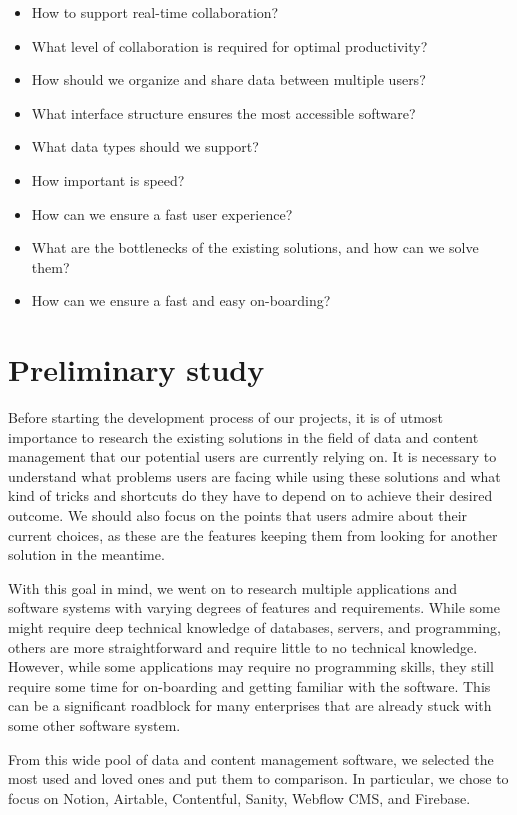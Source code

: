 \begin{itemize}
	\item How to support real-time collaboration?
	\item What level of collaboration is required for optimal productivity?
	\item How should we organize and share data between multiple users?
	\item What interface structure ensures the most accessible software?
	\item What data types should we support?
	\item How important is speed?
	\item How can we ensure a fast user experience?
	\item What are the bottlenecks of the existing solutions, and how can we solve them?
	\item How can we ensure a fast and easy on-boarding?
\end{itemize}

\section{Preliminary study}

Before starting the development process of our projects, it is of utmost importance to research the existing solutions in the field of data and content management that our potential users are currently relying on.
It is necessary to understand what problems users are facing while using these solutions and what kind of tricks and shortcuts do they have to depend on to achieve their desired outcome.
We should also focus on the points that users admire about their current choices, as these are the features keeping them from looking for another solution in the meantime.

With this goal in mind, we went on to research multiple applications and software systems with varying degrees of features and requirements.
While some might require deep technical knowledge of databases, servers, and programming, others are more straightforward and require little to no technical knowledge.
However, while some applications may require no programming skills, they still require some time for on-boarding and getting familiar with the software.
This can be a significant roadblock for many enterprises that are already stuck with some other software system.

From this wide pool of data and content management software, we selected the most used and loved ones and put them to comparison.
In particular, we chose to focus on Notion, Airtable, Contentful, Sanity, Webflow CMS, and Firebase.

